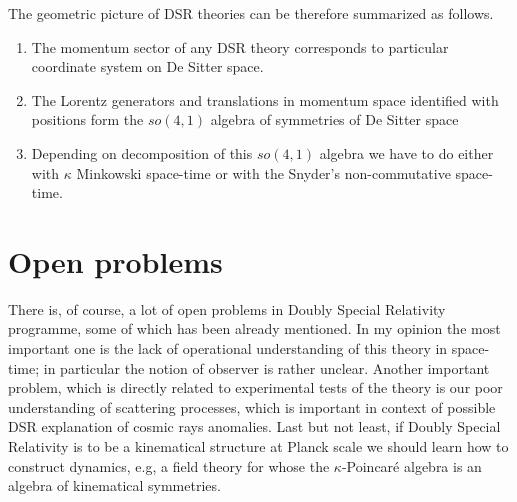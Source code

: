 \documentclass[a4paper,a4paper]{article}
\begin{document}
The geometric picture of DSR theories can be therefore summarized as follows. 
\begin{enumerate}
\item The momentum sector of any DSR theory corresponds to particular coordinate system on De Sitter space.
\item The Lorentz generators and translations in momentum space identified with positions form the $so(4,1)$ algebra of symmetries of De Sitter space
\item Depending on decomposition of this $so(4,1)$ algebra we have to do either with $\kappa$ Minkowski space-time or with the Snyder's non-commutative space-time.
\end{enumerate}

\section{Open problems}

There is, of course, a lot of open problems in Doubly Special Relativity programme, some of which has been already mentioned. In my opinion the most important one is the lack of operational understanding of this theory in space-time; in particular the notion of observer is rather unclear. Another important problem, which is directly related to experimental tests of the theory is our poor understanding of scattering processes, which is important in context of possible DSR explanation of cosmic rays anomalies. Last but not least, if Doubly Special Relativity is to be a kinematical structure at Planck scale we should learn how to construct dynamics, e.g, a field theory for whose the $\kappa$-Poincar\'e algebra is an algebra of kinematical symmetries. 
\end{document}
